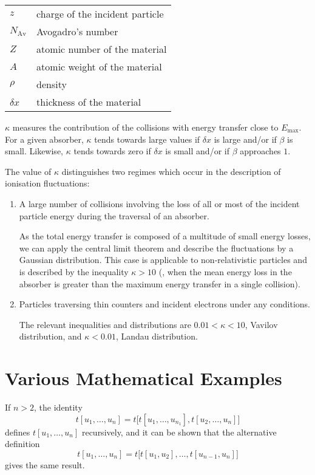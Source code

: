 \begin{tabular}{ll}
$z$ & charge of the incident particle \\
$N_{\mathrm{Av}}$ & Avogadro's number \\
$Z$ & atomic number of the material \\
$A$ & atomic weight of the material \\
$\rho$ & density \\
$ \delta x$ & thickness of the material \\
\end{tabular}

$\kappa$ measures the contribution of the collisions with energy transfer close to $E_{\mathrm{max}}$.  For a given absorber, $\kappa$ tends towards large values if $\delta x$ is large and/or if $\beta$ is small.  Likewise, $\kappa$ tends towards zero if $\delta x $ is small and/or if $\beta$ approaches $1$.

The value of $\kappa$ distinguishes two regimes which occur in the description of ionisation fluctuations:

\begin{enumerate}
\item A large number of collisions involving the loss of all or most of the incident particle energy during the traversal of an absorber.

As the total energy transfer is composed of a multitude of small energy losses, we can apply the central limit theorem and describe the fluctuations by a Gaussian distribution. This case is applicable to non-relativistic particles and is described by the inequality $\kappa > 10 $ (\ie, when the mean energy loss in the absorber is greater than the maximum energy transfer in a single collision).

\item Particles traversing thin counters and incident electrons under any conditions.

The relevant inequalities and distributions are $ 0.01 < \kappa < 10 $, Vavilov distribution, and $\kappa < 0.01 $, Landau distribution.
\end{enumerate}


\section{Various Mathematical Examples}

If $n > 2$, the identity \[t[u_1,\dots,u_n] = t\bigl[t[u_1,\dots,u_{n_1}], t[u_2,\dots,u_n] \bigr]\] defines $t[u_1,\dots,u_n]$ recursively, and it can be shown that the alternative definition \[t[u_1,\dots,u_n] = t\bigl[t[u_1,u_2],\dots,t[u_{n-1},u_n]\bigr]\] gives the same result.


